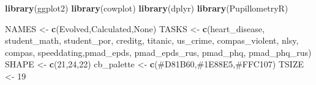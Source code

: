 \documentclass[
]{book}
\newenvironment{Shaded}{\begin{snugshade}}{\end{snugshade}}
\newcommand{\DecValTok}[1]{\textcolor[rgb]{0.00,0.00,0.81}{#1}}
\newcommand{\FunctionTok}[1]{\textcolor[rgb]{0.13,0.29,0.53}{\textbf{#1}}}
\newcommand{\NormalTok}[1]{#1}
\newcommand{\OtherTok}[1]{\textcolor[rgb]{0.56,0.35,0.01}{#1}}
\newcommand{\StringTok}[1]{\textcolor[rgb]{0.31,0.60,0.02}{#1}}
\begin{document}
\begin{Shaded}
\begin{Highlighting}[]
\FunctionTok{library}\NormalTok{(ggplot2)}
\FunctionTok{library}\NormalTok{(cowplot)}
\FunctionTok{library}\NormalTok{(dplyr)}
\FunctionTok{library}\NormalTok{(PupillometryR)}

\NormalTok{NAMES }\OtherTok{\textless{}{-}} \FunctionTok{c}\NormalTok{(}\StringTok{\textquotesingle{}Evolved\textquotesingle{}}\NormalTok{,}\StringTok{\textquotesingle{}Calculated\textquotesingle{}}\NormalTok{,}\StringTok{\textquotesingle{}None\textquotesingle{}}\NormalTok{)}
\NormalTok{TASKS }\OtherTok{\textless{}{-}} \FunctionTok{c}\NormalTok{(}\StringTok{\textquotesingle{}heart\_disease\textquotesingle{}}\NormalTok{, }\StringTok{\textquotesingle{}student\_math\textquotesingle{}}\NormalTok{, }\StringTok{\textquotesingle{}student\_por\textquotesingle{}}\NormalTok{, }\StringTok{\textquotesingle{}creditg\textquotesingle{}}\NormalTok{, }\StringTok{\textquotesingle{}titanic\textquotesingle{}}\NormalTok{, }\StringTok{\textquotesingle{}us\_crime\textquotesingle{}}\NormalTok{, }\StringTok{\textquotesingle{}compas\_violent\textquotesingle{}}\NormalTok{, }\StringTok{\textquotesingle{}nlsy\textquotesingle{}}\NormalTok{, }\StringTok{\textquotesingle{}compas\textquotesingle{}}\NormalTok{, }\StringTok{\textquotesingle{}speeddating\textquotesingle{}}\NormalTok{,}\StringTok{\textquotesingle{}pmad\_epds\textquotesingle{}}\NormalTok{, }\StringTok{\textquotesingle{}pmad\_epds\_rus\textquotesingle{}}\NormalTok{, }\StringTok{\textquotesingle{}pmad\_phq\textquotesingle{}}\NormalTok{, }\StringTok{\textquotesingle{}pmad\_phq\_rus\textquotesingle{}}\NormalTok{)}
\NormalTok{SHAPE }\OtherTok{\textless{}{-}} \FunctionTok{c}\NormalTok{(}\DecValTok{21}\NormalTok{,}\DecValTok{24}\NormalTok{,}\DecValTok{22}\NormalTok{)}
\NormalTok{cb\_palette }\OtherTok{\textless{}{-}} \FunctionTok{c}\NormalTok{(}\StringTok{\textquotesingle{}\#D81B60\textquotesingle{}}\NormalTok{,}\StringTok{\textquotesingle{}\#1E88E5\textquotesingle{}}\NormalTok{,}\StringTok{\textquotesingle{}\#FFC107\textquotesingle{}}\NormalTok{)}
\NormalTok{TSIZE }\OtherTok{\textless{}{-}} \DecValTok{19}


\end{Highlighting}
\end{Shaded}
\end{document}
